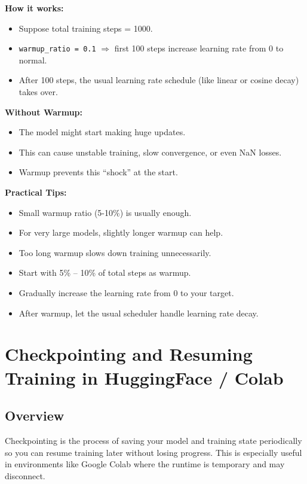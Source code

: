 \documentclass[a4paper, 12pt]{article}
\begin{document}
\textbf{How it works:}  
\begin{itemize}
    \item Suppose total training steps = 1000.  
    \item \texttt{warmup\_ratio = 0.1} $\Rightarrow$ first 100 steps increase learning rate from 0 to normal.  
    \item After 100 steps, the usual learning rate schedule (like linear or cosine decay) takes over.  
\end{itemize}

\textbf{Without Warmup:}  
\begin{itemize}
    \item The model might start making huge updates.  
    \item This can cause unstable training, slow convergence, or even NaN losses.  
    \item Warmup prevents this “shock” at the start.
\end{itemize}

\textbf{Practical Tips:}  
\begin{itemize}
    \item Small warmup ratio (5-10\%) is usually enough.  
    \item For very large models, slightly longer warmup can help.  
    \item Too long warmup slows down training unnecessarily.  
\end{itemize}

\begin{tcolorbox}[colback=green!5!white,colframe=green!75!black,title=Easy Rule of Thumb]
\begin{itemize}
    \item Start with 5\% -- 10\% of total steps as warmup.  
    \item Gradually increase the learning rate from 0 to your target.  
    \item After warmup, let the usual scheduler handle learning rate decay.
\end{itemize}
\end{tcolorbox}


\section*{Checkpointing and Resuming Training in HuggingFace / Colab}

\subsection*{Overview}
Checkpointing is the process of saving your model and training state periodically so you can resume training later without losing progress. This is especially useful in environments like Google Colab where the runtime is temporary and may disconnect.
\end{document}
